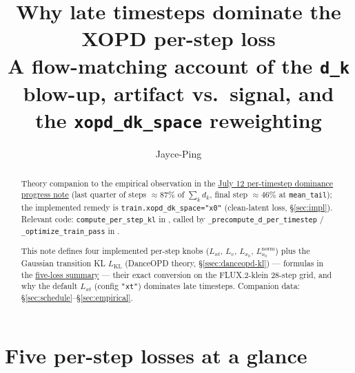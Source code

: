 \documentclass[11pt,a4paper]{article}
\title{\textbf{Why late timesteps dominate the XOPD per-step loss}\\[0.3em]
\large A flow-matching account of the \texttt{d\_k} blow-up, artifact vs.\ signal,
and the \texttt{xopd\_dk\_space} reweighting}
\author{Jayce-Ping}
\date{}
\newcommand{\dk}{d_k}
\begin{document}
\maketitle

\begin{abstract}
Theory companion to the empirical observation in the
\href{run:../../progress/2026-07-12-per-timestep-dk-dominance.md}{July 12 per-timestep
dominance progress note} (last quarter of steps
$\approx 87\%$ of $\sum_k \dk$, final step $\approx 46\%$ at \texttt{mean\_tail}); the implemented remedy is
\texttt{train.xopd\_dk\_space="x0"} (clean-latent loss, \S\ref{sec:impl}). Relevant
code: \texttt{compute\_per\_step\_kl} in
, called by
\texttt{\_precompute\_d\_per\_timestep} / \texttt{\_optimize\_train\_pass} in
.

This note defines four implemented per-step knobs ($L_{xt}$, $L_v$, $L_{x_0}$,
$L_{x_0}^{\mathrm{norm}}$) plus the Gaussian transition KL $L_{\mathrm{KL}}$ (DanceOPD theory,
\S\ref{ssec:danceopd-kl}) --- formulas in the
\hyperref[sec:loss-defs]{five-loss summary} --- their exact conversion on the
FLUX.2-klein 28-step grid, and why the default $L_{xt}$ (config \texttt{"xt"}) dominates late
timesteps. Companion data: \S\ref{sec:schedule}--\S\ref{sec:empirical}.
\end{abstract}

\tableofcontents

\section*{Five per-step losses at a glance}
{}
\label{sec:loss-defs}
\end{document}
